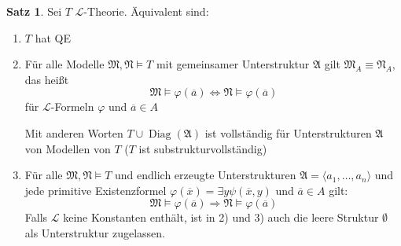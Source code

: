 \documentclass[12pt,parskip=full]{scrartcl}
\theoremstyle{definition}
\newtheorem{theorem}{Satz}[section]
\begin{document}
	\begin{theorem}
		Sei $T$ $\mathcal{L}$-Theorie. Äquivalent sind:
		\begin{enumerate}
			\item $T$ hat QE
			\item Für alle Modelle $\mathfrak{M}, \mathfrak{N} \models T$ mit gemeinsamer Unterstruktur $\mathfrak{A}$ gilt $\mathfrak{M}_A \equiv \mathfrak{N}_A$, das heißt
			\begin{equation*}
				\mathfrak{M} \models \varphi(\overline{a}) \Leftrightarrow \mathfrak{N} \models \varphi(\overline{a})
			\end{equation*}
			für $\mathcal{L}$-Formeln $\varphi$ und $\overline{a} \in A$
			
			Mit anderen Worten $T \cup \operatorname{Diag}(\mathfrak{A})$ ist vollständig für Unterstrukturen $\mathfrak{A}$ von Modellen von $T$ ($T$ ist substrukturvollständig)
			\item Für alle $\mathfrak{M}, \mathfrak{N} \models T$ und endlich erzeugte Unterstrukturen $\mathfrak{A} = \langle a_1, \dots, a_n \rangle$ und jede primitive Existenzformel $\varphi(\overline{x}) = \exists y \psi(\overline{x}, y)$ und $\overline{a} \in A$ gilt:
			\begin{equation*}
				\mathfrak{M} \models \varphi(\overline{a}) \Rightarrow \mathfrak{N} \models \varphi(\overline{a})
			\end{equation*}
			Falls $\mathcal{L}$ keine Konstanten enthält, ist in 2) und 3) auch die leere Struktur $\emptyset$ als Unterstruktur zugelassen.
		\end{enumerate}
	\end{theorem}
\end{document}
